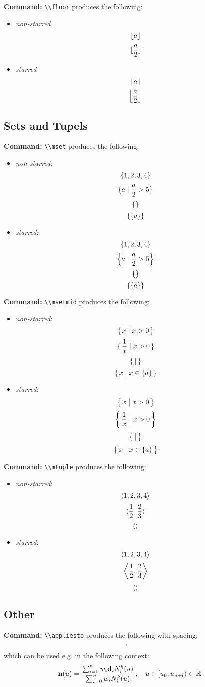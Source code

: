 \documentclass[10pt]{article}
\newcommand{\commandcmd}[1]{\par\noindent\textbf{Command:} \lstinline^\\#1^}
\begin{document}
\commandcmd{floor} produces the following:
\begin{itemize}
  \item \emph{non-starred}
        \[\floor{a}\]
        \[\floor{\frac{a}{2}}\]
  \item \emph{starred}
        \[\floor*{a}\]
        \[\floor*{\frac{a}{2}}\]
\end{itemize}

\subsection{Sets and Tupels}
\commandcmd{mset} produces the following:
\begin{itemize}
  \item \emph{non-starred}:
        \[\mset{1, 2, 3, 4}\]
        \[\mset{a \mid \frac{a}{2} > 5}\]
        \[\mset{}\]
        \[\mset{\mset{a}}\]
  \item \emph{starred}:
        \[\mset*{1, 2, 3, 4}\]
        \[\mset*{a \mid \frac{a}{2} > 5}\]
        \[\mset*{}\]
        \[\mset*{\mset*{a}}\]
\end{itemize}

\commandcmd{msetmid} produces the following:
\begin{itemize}
  \item \emph{non-starred}:
        \[\msetmid{x}{x > 0}\]
        \[\msetmid{\frac{1}{x}}{x > 0}\]
        \[\msetmid{}{}\]
        \[\msetmid{x}{x \in \mset{a}}\]
  \item \emph{starred}:
        \[\msetmid*{x}{x > 0}\]
        \[\msetmid*{\frac{1}{x}}{x > 0}\]
        \[\msetmid*{}{}\]
        \[\msetmid*{x}{x \in \mset{a}}\]
\end{itemize}

\commandcmd{mtuple} produces the following:
\begin{itemize}
  \item \emph{non-starred}:
        \[\mtuple{1, 2, 3, 4}\]
        \[\mtuple{\frac{1}{2}, \frac{2}{3}}\]
        \[\mtuple{}\]
  \item \emph{starred}:
        \[\mtuple*{1, 2, 3, 4}\]
        \[\mtuple*{\frac{1}{2}, \frac{2}{3}}\]
        \[\mtuple*{}\]
\end{itemize}

\subsection{Other}

\commandcmd{appliesto} produces the following with spacing:
\[\appliesto\]
which can be used e.g. in the following context:
\[\mathbf{n}(u) = \frac{\sum_{i = 0}^n w_i \mathbf{d}_i N_i^k(u)}{\sum_{i = 0}^n w_i N_i^k(u)} \appliesto u \in \left[u_0, u_{n + l}\right) \subset \mathbb{R}\]
\end{document}
